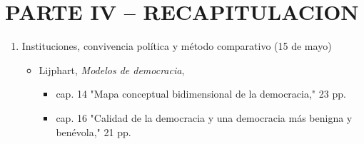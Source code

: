\documentclass{article}
\begin{document}
\section{PARTE IV – RECAPITULACION}
\label{sec:orgb839eb0}
\begin{enumerate}
\item Instituciones, convivencia política y método comparativo (15 de mayo)
\label{sec:org33679b7}
\begin{itemize}
\item Lijphart, \emph{Modelos de democracia}, 
\begin{itemize}
\item cap. 14 "Mapa conceptual bidimensional de la democracia," 23 pp.
\item cap. 16 "Calidad de la democracia y una democracia más benigna y benévola," 21 pp.
\end{itemize}
\end{itemize}
\end{enumerate}
\end{document}

